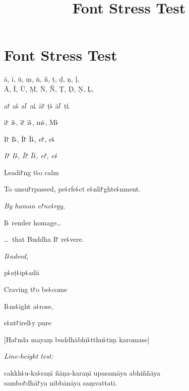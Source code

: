 \documentclass[ babelLanguage=english, final, ]{chantingbook}
\title{Font Stress Test}
\begin{document}
\mainmatter

\chapter{Font Stress Test}

ā, ī, ū, ṃ, ṅ, ñ, ṭ, ḍ, ṇ, ḷ,\\
Ā, Ī, Ū, Ṃ, Ṅ, Ñ, Ṭ, Ḍ, Ṇ, Ḷ,

\begin{multicols}{2}

a꜓ a꜕ a꜒ a꜖ ā꜓ ṭ꜕ ā꜒ ṭ꜖

i꜓ i꜕, ī꜓ ī꜕, m꜕, M꜕

I꜓ I꜕, Ī꜓ Ī꜕, e꜓, e꜕

\textit{I꜓ I꜕, Ī꜓ Ī꜕, e꜓, e꜕}

Leadi꜓ng t꜕o calm

To unsu꜓rpassed, pe꜕rfe꜕ct e꜕nli꜓ghte꜕nment.

\textit{By human e꜓ne꜕rgy,}

I꜕ render homage\ldots

\ldots\ that Buddha I꜓ re꜕vere.

\textit{I꜕ndeed,}

p꜕aṭ꜕ip꜕adā

Craving t꜓o be꜕come

I꜕ns꜕ight a꜕rose,

e꜕nt꜓irel꜕y pure

\end{multicols}

[Ha꜓nda mayaṃ buddhābhi꜕tthu꜕tiṃ karomase]

\textit{Line-height test:}

cakkh꜕u-ka꜕raṇī ñāṇa-karaṇī upasamāya abhiññāya\\
sambo꜓dhā꜓ya nibbānāya saṃvattati.
\end{document}
